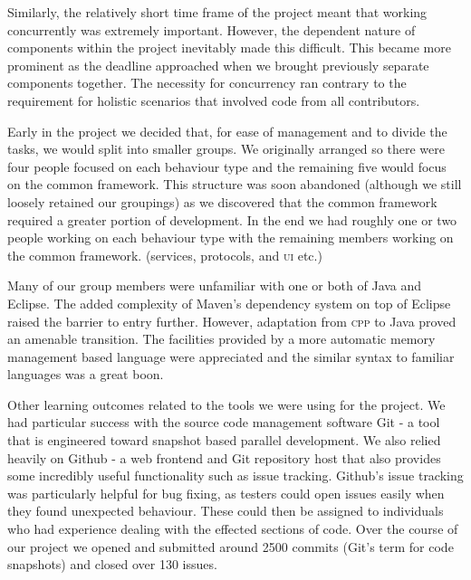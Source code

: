 Similarly, the relatively short time frame of the project meant that working concurrently was extremely important. However, the dependent nature of components within the project inevitably made this difficult. This became more prominent as the deadline approached when we brought previously separate components together. The necessity for concurrency ran contrary to the requirement for holistic scenarios that involved code from all contributors.

Early in the project we decided that, for ease of management and to divide the tasks, we would split into smaller groups. We originally arranged so there were four people focused on each behaviour type and the remaining five would focus on the common framework. This structure was soon abandoned (although we still loosely retained our groupings) as we discovered that the common framework required a greater portion of development. In the end we had roughly one or two people working on each behaviour type with the remaining members working on the common framework. (services, protocols, and \textsc{ui} etc.) 

Many of our group members were unfamiliar with one or both of Java and Eclipse. The added complexity of Maven's dependency system on top of Eclipse raised the barrier to entry further. However, adaptation from \textsc{cpp} to Java proved an amenable transition. The facilities provided by a more automatic memory management based language were appreciated and the similar syntax to familiar languages was a great boon.

Other learning outcomes related to the tools we were using for the project. We had particular success with the source code management software Git - a tool that is engineered toward snapshot based parallel development. We also relied heavily on Github - a web frontend and Git repository host that also provides some incredibly useful functionality such as issue tracking. Github's issue tracking was particularly helpful for bug fixing, as testers could open issues easily when they found unexpected behaviour. These could then be assigned to individuals who had experience dealing with the effected sections of code. Over the course of our project we opened and submitted around 2500 commits (Git's term for code snapshots) and closed over 130 issues.
